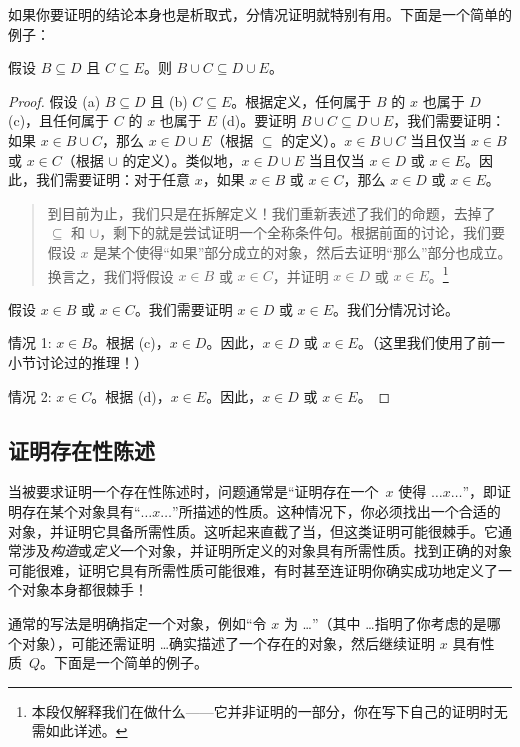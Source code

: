 \documentclass[../../../include/open-logic-section]{subfiles}
\begin{document}
如果你要证明的结论本身也是析取式，分情况证明就特别有用。下面是一个简单的例子：

\begin{prop}
假设 $B \subseteq D$ 且 $C \subseteq E$。则 $B \cup C \subseteq D \cup E$。
\end{prop}

\begin{proof}
  假设 (a) $B \subseteq D$ 且 (b) $C \subseteq E$。根据定义，任何属于 $B$ 的 $x$ 也属于 $D$ (c)，且任何属于 $C$ 的 $x$ 也属于 $E$ (d)。要证明 $B \cup C \subseteq D \cup E$，我们需要证明：如果 $x \in B \cup C$，那么 $x \in D \cup E$（根据 $\subseteq$ 的定义）。$x \in B \cup C$ 当且仅当 $x \in B$ 或 $x \in C$（根据 $\cup$ 的定义）。类似地，$x \in D \cup E$ 当且仅当 $x \in D$ 或 $x \in E$。因此，我们需要证明：对于任意 $x$，如果 $x \in B$ 或 $x \in C$，那么 $x \in D$ 或 $x \in E$。

  \begin{quote}
  到目前为止，我们只是在拆解定义！我们重新表述了我们的命题，去掉了 $\subseteq$ 和 $\cup$，剩下的就是尝试证明一个全称条件句。根据前面的讨论，我们要假设 $x$ 是某个使得“如果”部分成立的对象，然后去证明“那么”部分也成立。换言之，我们将假设 $x \in B$ 或 $x \in C$，并证明 $x \in D$ 或 $x \in E$。\footnote{本段仅解释我们在做什么——它并非证明的一部分，你在写下自己的证明时无需如此详述。}
  \end{quote}

  假设 $x \in B$ 或 $x \in C$。我们需要证明 $x \in D$ 或 $x \in E$。我们分情况讨论。

  情况 1: $x \in B$。根据 (c)，$x \in D$。因此，$x \in D$ 或 $x \in E$。（这里我们使用了前一小节讨论过的推理！）

  情况 2: $x \in C$。根据 (d)，$x \in E$。因此，$x \in D$ 或 $x \in E$。
 \end{proof}


\subsection{证明存在性陈述}

当被要求证明一个存在性陈述时，问题通常是“证明存在一个~$x$ 使得 $\dots x \dots$”，即证明存在某个对象具有“$\dots x \dots$”所描述的性质。这种情况下，你必须找出一个合适的对象，并证明它具备所需性质。这听起来直截了当，但这类证明可能很棘手。它通常涉及\emph{构造}或\emph{定义}一个对象，并证明所定义的对象具有所需性质。找到正确的对象可能很难，证明它具有所需性质可能很难，有时甚至连证明你确实成功地定义了一个对象本身都很棘手！{}

通常的写法是明确指定一个对象，例如“令 $x$ 为 \dots”（其中 \dots 指明了你考虑的是哪个对象），可能还需证明 \dots 确实描述了一个存在的对象，然后继续证明 $x$ 具有性质~$Q$。下面是一个简单的例子。
\end{document}
